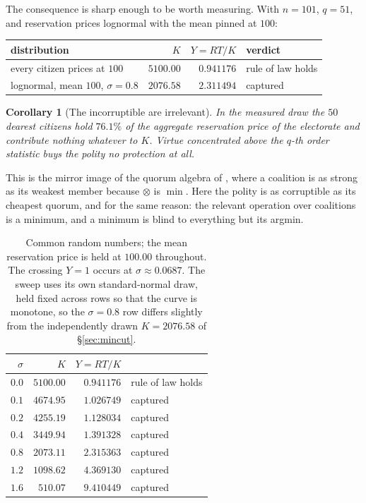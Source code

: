 \documentclass[11pt]{article}
\theoremstyle{plain}
\newtheorem{corollary}[theorem]{Corollary}
\theoremstyle{definition}
\theoremstyle{remark}
\begin{document}
The consequence is sharp enough to be worth measuring. With $n = 101$,
$q = 51$, and reservation prices lognormal with the mean pinned at $100$:

\begin{center}
\begin{tabular}{lrrl}
\toprule
distribution & $K$ & $Y = RT/K$ & verdict\\
\midrule
every citizen prices at $100$ & $5100.00$ & $0.941176$ & rule of law holds\\
lognormal, mean $100$, $\sigma = 0.8$ & $2076.58$ & $2.311494$ & captured\\
\bottomrule
\end{tabular}
\end{center}

\begin{corollary}[The incorruptible are irrelevant]
\label{cor:irrelevant}
In the measured draw the $50$ dearest citizens hold $76.1\%$ of the aggregate
reservation price of the electorate and contribute nothing whatever to $K$.
Virtue concentrated above the $q$-th order statistic buys the polity no
protection at all.
\end{corollary}

This is the mirror image of the quorum algebra of \cite[\S6]{quorum}, where a
coalition is as strong as its weakest member because $\otimes$ is $\min$. Here
the polity is as corruptible as its cheapest quorum, and for the same reason:
the relevant operation over coalitions is a minimum, and a minimum is blind to
everything but its argmin.

\begin{table}[t]
\centering
\begin{tabular}{rrrl}
\toprule
$\sigma$ & $K$ & $Y = RT/K$ & \\
\midrule
$0.0$ & $5100.00$ & $0.941176$ & rule of law holds\\
$0.1$ & $4674.95$ & $1.026749$ & captured\\
$0.2$ & $4255.19$ & $1.128034$ & captured\\
$0.4$ & $3449.94$ & $1.391328$ & captured\\
$0.8$ & $2073.11$ & $2.315363$ & captured\\
$1.2$ & $1098.62$ & $4.369130$ & captured\\
$1.6$ & $\phantom{0}510.07$ & $9.410449$ & captured\\
\bottomrule
\end{tabular}
\caption{Common random numbers; the mean reservation price is held at $100.00$
throughout. The crossing $Y = 1$ occurs at $\sigma \approx 0.0687$. The sweep
uses its own standard-normal draw, held fixed across rows so that the curve is
monotone, so the $\sigma = 0.8$ row differs slightly from the independently
drawn $K = 2076.58$ of \S\ref{sec:mincut}.}
\label{tab:sigma}
\end{table}
\end{document}
